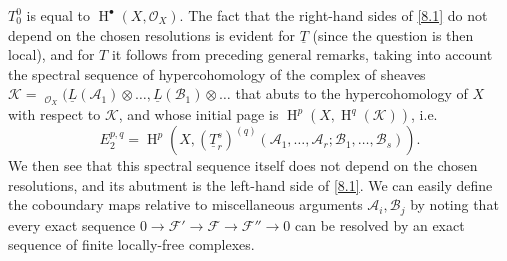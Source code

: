 \documentclass{article}
\theoremstyle{plain}
\theoremstyle{definition}
\newcommand{\sh}{\mathscr}
\DeclareMathOperator{\shHom}{\underline{Hom}}
\DeclareMathOperator{\HH}{H}
\begin{document}
$T_0^0$ is equal to $\HH^\bullet(X,\sh{O}_X)$.
The fact that the right-hand sides of \cref{8.1} do not depend on the chosen resolutions is evident for $\underline{T}$ (since the question is then local), and for $T$ it follows from preceding general remarks, taking into account the spectral sequence of hypercohomology of the complex of sheaves $\sh{K}=\shHom_{\sh{O}_X}(\underline{L}(\sh{A}_1)\otimes\ldots,\underline{L}(\sh{B}_1)\otimes\ldots$ that abuts to the hypercohomology of $X$ with respect to $\sh{K}$, and whose initial page is $\HH^p(X,\HH^q(\sh{K}))$, i.e.
\[
\label{8.2}
  E_2^{p,q} = \HH^p(X,(\underline{T}_r^s)^{(q)}(\sh{A}_1,\ldots,\sh{A}_r;\sh{B}_1,\ldots,\sh{B}_s)).
\tag{8.2}
\]
We then see that this spectral sequence itself does not depend on the chosen resolutions, and its abutment is the left-hand side of \cref{8.1}.
We can easily define the coboundary maps relative to miscellaneous arguments $\sh{A}_i,\sh{B}_j$ by noting that every exact sequence $0\to\sh{F}'\to\sh{F}\to\sh{F}''\to0$ can be resolved by an exact sequence of finite locally-free complexes.
\end{document}
